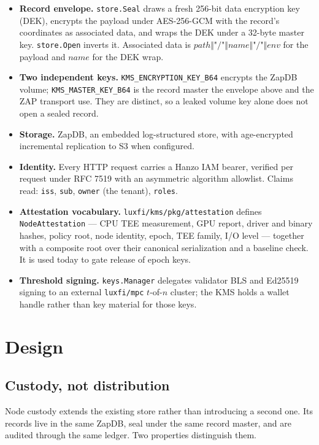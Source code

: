 \documentclass[11pt,a4paper]{article}
\newcommand{\code}[1]{\texttt{#1}}
\begin{document}
\begin{itemize}[leftmargin=*]
  \item \textbf{Record envelope.} \code{store.Seal} draws a fresh 256-bit data
    encryption key (DEK), encrypts the payload under AES-256-GCM with the
    record's coordinates as associated data, and wraps the DEK under a 32-byte
    master key. \code{store.Open} inverts it. Associated data is
    $\mathit{path} \Vert \texttt{"/"} \Vert \mathit{name} \Vert \texttt{"/"}
    \Vert \mathit{env}$ for the payload and $\mathit{name}$ for the DEK wrap.
  \item \textbf{Two independent keys.} \code{KMS\_ENCRYPTION\_KEY\_B64} encrypts
    the ZapDB volume; \code{KMS\_MASTER\_KEY\_B64} is the record master the
    envelope above and the ZAP transport use. They are distinct, so a leaked
    volume key alone does not open a sealed record.
  \item \textbf{Storage.} ZapDB, an embedded log-structured store, with
    age-encrypted incremental replication to S3 when configured.
  \item \textbf{Identity.} Every HTTP request carries a Hanzo IAM bearer, verified
    per request under RFC 7519 with an asymmetric algorithm allowlist. Claims
    read: \code{iss}, \code{sub}, \code{owner} (the tenant), \code{roles}.
  \item \textbf{Attestation vocabulary.} \code{luxfi/kms/pkg/attestation} defines
    \code{NodeAttestation} --- CPU TEE measurement, GPU report, driver and binary
    hashes, policy root, node identity, epoch, TEE family, I/O level --- together
    with a composite root over their canonical serialization and a baseline
    check. It is used today to gate release of epoch keys.
  \item \textbf{Threshold signing.} \code{keys.Manager} delegates validator BLS and
    Ed25519 signing to an external \code{luxfi/mpc} $t$-of-$n$ cluster; the KMS
    holds a wallet handle rather than key material for those keys.
\end{itemize}

\section{Design}

\subsection{Custody, not distribution}

Node custody extends the existing store rather than introducing a second one.
Its records live in the same ZapDB, seal under the same record master, and are
audited through the same ledger. Two properties distinguish them.
\end{document}
